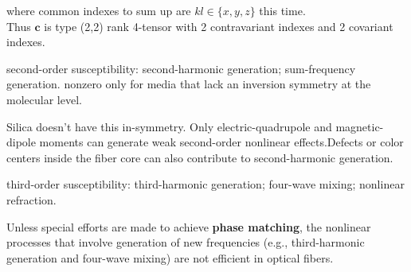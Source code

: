 \documentclass[12pt]{extarticle}
\numberwithin{equation}{section}
\numberwithin{figure}{section}
\numberwithin{table}{section}
\newcommand{\<}{\langle}
\renewcommand{\>}{\rangle}
\theoremstyle{definition}
\newcommand{\SubItem}[1]{
    {\setlength\itemindent{15pt} \item[-] #1}
}
\begin{document}
\begin{itemize}
{\begin{itemize}
                            where common indexes to sum up are $ kl \in \{x,y,z\} $ this time. \\
                            Thus $\boldsymbol{c}$ is type (2,2) rank 4-tensor with 2 contravariant indexes and 2 covariant indexes.
                    \end{itemize}
                }
            \item second-order susceptibility: second-harmonic generation; sum-frequency generation. nonzero only for media that lack an inversion symmetry at the molecular level. 
                \SubItem{Silica doesn't have this in-symmetry. Only electric-quadrupole and magnetic-dipole moments can generate weak second-order nonlinear effects.Defects or color centers inside the fiber core can also contribute to second-harmonic generation.}
            \item third-order susceptibility: third-harmonic generation; four-wave mixing; nonlinear refraction.
                \SubItem{Unless special efforts are made to achieve \textbf{phase matching}, the nonlinear processes that involve generation of new frequencies (e.g., third-harmonic generation and four-wave mixing) are not efficient in optical fibers.\label{Why nonlinear refraction most important} }
        \end{itemize}
        
\end{document}
